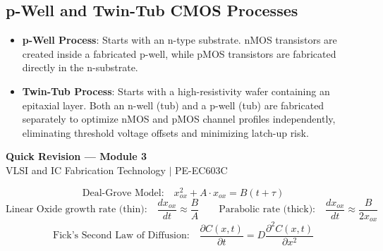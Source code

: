 \documentclass[12pt,a4paper]{article}
\begin{document}
\subsection{p-Well and Twin-Tub CMOS Processes}
\begin{itemize}[leftmargin=*, itemsep=3.5pt]
  \item \textbf{p-Well Process}: Starts with an n-type substrate. nMOS transistors are created inside a fabricated p-well, while pMOS transistors are fabricated directly in the n-substrate.
  \item \textbf{Twin-Tub Process}: Starts with a high-resistivity wafer containing an epitaxial layer. Both an n-well (tub) and a p-well (tub) are fabricated separately to optimize nMOS and pMOS channel profiles independently, eliminating threshold voltage offsets and minimizing latch-up risk.
\end{itemize}

\newpage
\begin{center}
  {\large\bfseries\color{myred} Quick Revision --- Module 3}\\[3pt]
  {\small\color{mydark} VLSI and IC Fabrication Technology $|$ PE-EC603C}
\end{center}
\noindent{\color{myred}\rule{\linewidth}{1.2pt}}
\vspace{4pt}

\begin{tcolorbox}[formulabox, title={\textbf{Key Fabrication Equations}}]
$$\text{Deal-Grove Model:} \quad x_{ox}^2 + A \cdot x_{ox} = B(t + \tau)$$
$$\text{Linear Oxide growth rate (thin):} \quad \frac{dx_{ox}}{dt} \approx \frac{B}{A} \qquad \text{Parabolic rate (thick):} \quad \frac{dx_{ox}}{dt} \approx \frac{B}{2x_{ox}}$$
$$\text{Fick's Second Law of Diffusion:} \quad \frac{\partial C(x,t)}{\partial t} = D \frac{\partial^2 C(x,t)}{\partial x^2}$$
\end{tcolorbox}
\end{document}
